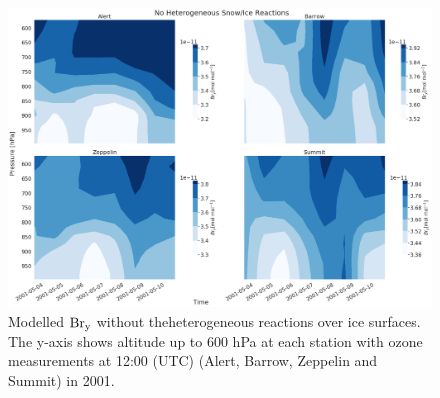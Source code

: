 \begin{figure}
    \centering
    \includegraphics[width = \linewidth]{Chapter6_Results/images/noSnowIce_2001_bry.png}
    \caption{Modelled $\mathrm{Br_y}$ without theheterogeneous reactions over ice surfaces. The y-axis shows altitude up to 600 hPa at each station with ozone measurements at 12:00 (UTC) (Alert, Barrow, Zeppelin and Summit) in 2001.}
    \label{fig:vert_noSnowIce_bry_2001}
\end{figure}